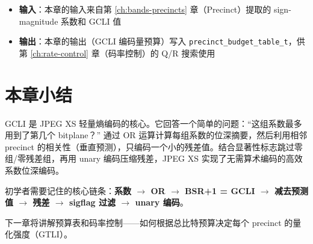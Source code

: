 \begin{itemize}
  \item \textbf{输入}：本章的输入来自第 \ref{ch:bands-precincts} 章（Precinct）提取的 sign-magnitude 系数和 GCLI 值
  \item \textbf{输出}：本章的输出（GCLI 编码量预算）写入 \texttt{precinct\_budget\_table\_t}，供第 \ref{ch:rate-control} 章（码率控制）的 Q/R 搜索使用
\end{itemize}

\section{本章小结}

GCLI 是 JPEG XS 轻量熵编码的核心。它回答一个简单的问题：``这组系数最多用到了第几个 bitplane？'' 通过 OR 运算计算每组系数的位深摘要，然后利用相邻 precinct 的相关性（垂直预测），只编码一个小的残差值。结合显著性标志跳过零组/零残差组，再用 unary 编码压缩残差，JPEG XS 实现了无需算术编码的高效系数位深编码。

初学者需要记住的核心链条：\textbf{系数 $\to$ OR $\to$ BSR+1 = GCLI $\to$ 减去预测值 $\to$ 残差 $\to$ sigflag 过滤 $\to$ unary 编码}。

下一章将讲解预算表和码率控制——如何根据总比特预算决定每个 precinct 的量化强度（GTLI）。
